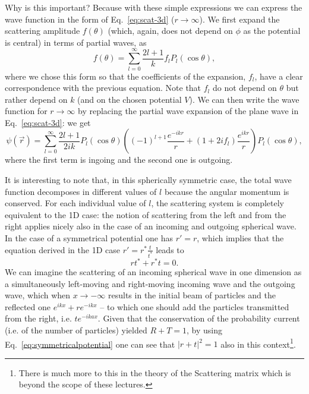 Why is this important? Because with these simple expressions we can express the wave function in the form of Eq.~\eqref{eq:scat-3d} ($r\to\infty$). We first expand the scattering amplitude $f(\theta)$ (which, again, does not depend on $\phi$ as the potential is central) in terms of partial waves, as
\begin{equation}\label{eq:fthetaform} f(\theta) = \sum_{l=0}^{\infty}  \dfrac{2l+1}{k} f_l P_l(\cos \theta),\end{equation}
where we chose this form so that the coefficients of the expansion, $f_l$, have a clear correspondence with the previous equation. Note  that $f_l$ do not depend on $\theta$ but rather depend on $k$ (and on the chosen potential $V$).
We can then write the wave function for $r\to\infty$ by replacing the partial wave expansion of the plane wave in Eq.~\eqref{eq:scat-3d}: we get
\[\psi(\vec{r}) =  \sum_{l=0}^{\infty}  \dfrac{2l+1}{2ik} P_l (\cos \theta) \left ( (-1)^{l+1} \dfrac{e^{-ikr}}{r} +(1 + 2i f_l)  \dfrac{e^{ikr}}{r}  \right ) P_l (\cos \theta),\]
where the first term is ingoing and the second one is outgoing.

It is interesting to note that, in this spherically symmetric case, the total wave function decomposes in different values of $l$ because the angular momentum is conserved. For each individual value of $l$, the scattering system is completely equivalent to the 1D case: the notion of scattering from the left and from the right  applies nicely also in the case of an incoming and outgoing spherical wave. In the case of a symmetrical potential one has $r'= r$, which implies that the equation derived in the 1D case  $r'= r^*\frac{t}{t^*}$ leads to
\begin{equation}
\label{eq:symmetricalpotential}
rt^* + r^*t = 0.
\end{equation}
We can imagine the scattering of an incoming spherical wave in one dimension as a simultaneously left-moving and right-moving incoming wave and the outgoing wave, which when $x \rightarrow -\infty$ results in the initial beam of particles and the reflected one $e^{ikx}+r e^{-ikx}$ -- to which one should add the particles transmitted from the right, i.e. $t e^{-ikax}$. Given that the conservation of the probability current (i.e. of the number of particles) yielded $R + T = 1 $, by using Eq.~\ref{eq:symmetricalpotential} one can see that $|r+t|^2 = 1$ also in this context\footnote{There is much more to this in the theory of the Scattering matrix which is beyond the scope of these lectures.}. 

